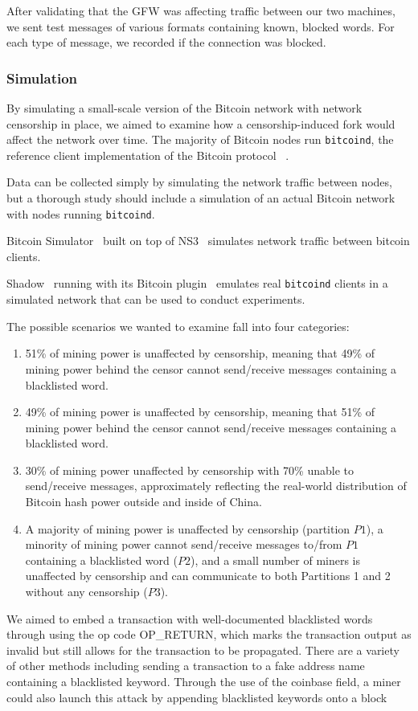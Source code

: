 After validating that the GFW was affecting traffic between our two machines, we sent test messages of various formats containing known, blocked words. For each type of message, we recorded if the connection was blocked.

\subsubsection{Simulation}
By simulating a small-scale version of the Bitcoin network with network censorship in place, we aimed to examine how a censorship-induced fork would affect the network over time. The majority of Bitcoin nodes run \texttt{bitcoind}, the reference client implementation of the Bitcoin protocol ~\cite{shadow-bitcoin}.

Data can be collected simply by simulating the network traffic between nodes, but a thorough study should include a simulation of an actual Bitcoin network with nodes running \texttt{bitcoind}.

Bitcoin Simulator~\cite{bitcoin-simulator} built on top of NS3~\cite{NS3} simulates network traffic between bitcoin clients. %

Shadow~\cite{shadow} running with its Bitcoin plugin~\cite{shadow-bitcoin} emulates real \texttt{bitcoind} clients in a simulated network that can be used to conduct experiments.

The possible scenarios we wanted to examine fall into four categories:
\begin{enumerate}
\item 51\% of mining power is unaffected by censorship, meaning that 49\% of mining power behind the censor cannot send/receive messages containing a blacklisted word.
\item 49\% of mining power is unaffected by censorship, meaning that 51\% of mining power behind the censor cannot send/receive messages containing a blacklisted word.
\item 30\% of mining power unaffected by censorship with 70\% unable to send/receive messages, approximately reflecting the real-world distribution of Bitcoin hash power outside and inside of China.
\item A majority of mining power is unaffected by censorship (partition $P1$), a minority of mining power cannot send/receive messages to/from $P1$ containing a blacklisted word ($P2$), and a small number of miners is unaffected by censorship and can communicate to both Partitions 1 and 2 without any censorship ($P3$).
\end{enumerate}

We aimed to embed a transaction with well-documented blacklisted words through using the op code OP\_RETURN, which marks the transaction output as invalid but still allows for the transaction to be propagated. There are a variety of other methods including sending a transaction to a fake address name containing a blacklisted keyword. Through the use of the coinbase field, a miner could also launch this attack by appending blacklisted keywords onto a block 

